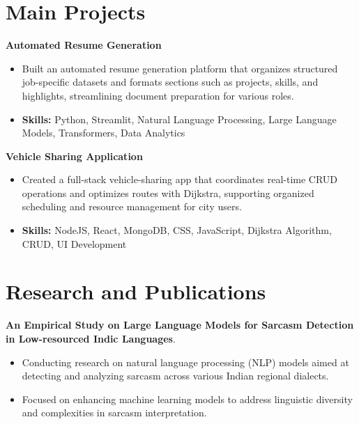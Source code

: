 \documentclass[a4paper,11pt]{article}
\begin{document}
\section{\textbf{Main Projects}}

\vspace{1mm}
  \textbf{Automated Resume Generation  }
\vspace{-1.5mm} %
\begin{itemize}
  \item Built an automated resume generation platform that organizes structured job-specific datasets and formats sections such as projects, skills, and highlights, streamlining document preparation for various roles.
\vspace{-3mm}
  \item \textbf{Skills:} Python, Streamlit, Natural Language Processing, Large Language Models, Transformers, Data Analytics
\end{itemize}


\vspace{1mm}
   \textbf{Vehicle Sharing Application }
\vspace{-1.5mm} %
\begin{itemize}
  \item Created a full-stack vehicle-sharing app that coordinates real-time CRUD operations and optimizes routes with Dijkstra, supporting organized scheduling and resource management for city users.
\vspace{-3mm}
  \item \textbf{Skills:} NodeJS, React, MongoDB, CSS, JavaScript, Dijkstra Algorithm, CRUD, UI Development
\end{itemize}



\section{\textbf{Research and Publications} \hfill }
\vspace{1mm}
  \textbf{An Empirical Study on Large Language Models for Sarcasm Detection in Low-resourced Indic Languages}.
\vspace{-1mm} %
\begin{itemize}
  \item Conducting research on natural language processing (NLP) models aimed at detecting and analyzing sarcasm across various Indian regional dialects.
\vspace{-3mm}
  \item Focused on enhancing machine learning models to address linguistic diversity and complexities in sarcasm interpretation.
\end{itemize}
\end{document}

